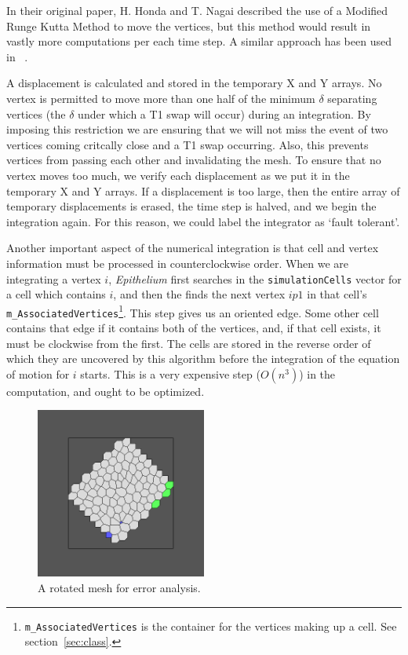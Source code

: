 In their original paper, H. Honda and T. Nagai described the use of a Modified Runge Kutta Method\cite{HondaNagai} to move the vertices, but this method would result in vastly more computations per each time step. A similar approach has been used in ~\cite{WO, ChasteMain}. 

A displacement is calculated and stored in the temporary X and Y arrays. No vertex is permitted to move more than one half of the minimum $\delta$ separating vertices (the $\delta$ under which a T1 swap will occur) during an integration. By imposing this restriction we are ensuring that we will not miss the event of two vertices coming critcally close and a T1 swap occurring. Also, this prevents vertices from passing each other and invalidating the mesh. To ensure that no vertex moves too much, we verify each displacement as we put it in the temporary X and Y arrays. If a displacement is too large, then the entire array of temporary displacements is erased, the time step is halved, and we begin the integration again. For this reason, we could label the integrator as `fault tolerant'.

Another important aspect of the numerical integration is that cell and vertex information must be processed in counterclockwise order. When we are integrating a vertex $i$, \emph{Epithelium} first searches in the \texttt{simulationCells} vector for a cell which contains $i$, and then the finds the next vertex $ip1$ in that cell's \texttt{m\_AssociatedVertices}\footnote{\texttt{m\_AssociatedVertices} is the container for the vertices making up a cell. See section~\ref{sec:class}.}. This step gives us an oriented edge. Some other cell contains that edge if it contains both of the vertices, and, if that cell exists, it must be clockwise from the first. The cells are stored in the reverse order of which they are uncovered by this algorithm before the integration of the equation of motion for $i$ starts. This is a very expensive step ($O(n^3)$) in the computation, and ought to be optimized.

\begin{figure}[hr]
\centering
\includegraphics[width=0.5\textwidth]{../diagrams/rotate.png}
\caption{A rotated mesh for error analysis.}
\label{fig:rotate}
\end{figure}

